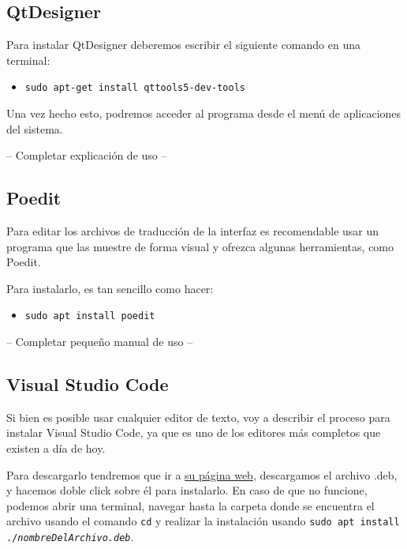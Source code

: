 \subsection{QtDesigner}
Para instalar QtDesigner deberemos escribir el siguiente comando en una terminal:
\begin{itemize}
    \item \texttt{sudo apt-get install qttools5-dev-tools}
\end{itemize}
Una vez hecho esto, podremos acceder al programa desde el menú de aplicaciones del sistema.

-- Completar explicación de uso --

\subsection{Poedit}
Para editar los archivos de traducción de la interfaz es recomendable usar un programa que las muestre de forma visual y ofrezca algunas herramientas, como Poedit.

Para instalarlo, es tan sencillo como hacer:
\begin{itemize}
    \item \texttt{sudo apt install poedit}
\end{itemize}

-- Completar pequeño manual de uso --

\subsection{Visual Studio Code}
Si bien es posible usar cualquier editor de texto, voy a describir el proceso para instalar Visual Studio Code, ya que es uno de los editores más completos que existen a día de hoy.

Para descargarlo tendremos que ir a \href{https://code.visualstudio.com/}{su página web}, descargamos el archivo .deb, y hacemos doble click sobre él para instalarlo. En caso de que no funcione, podemos abrir una terminal, navegar hasta la carpeta donde se encuentra el archivo usando el comando \texttt{cd} y realizar la instalación usando \texttt{sudo apt install ./\textit{nombreDelArchivo.deb}}.

